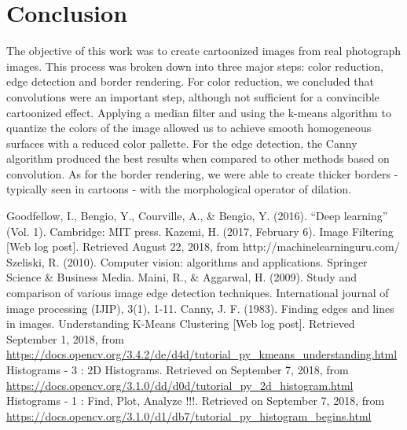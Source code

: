 \documentclass[]{IEEEtran}
\begin{document}
  \section{Conclusion}
    The objective of this work was to create cartoonized images from real photograph images.
    This process was broken down into three major steps: color reduction, edge detection and border rendering.
    For color reduction, we concluded that convolutions were an important step, although not sufficient for a
    convincible cartoonized effect. Applying a median filter and using the k-means algorithm to quantize the colors
    of the image allowed us to achieve smooth homogeneous surfaces with a reduced color pallette. For the edge detection,
    the Canny algorithm produced the best results when compared to other methods based on convolution.
    As for the border rendering, we were able to create thicker borders - typically seen in cartoons - with the morphological operator of dilation.

\begin{thebibliography}{00}
     Goodfellow, I., Bengio, Y., Courville, A., \& Bengio, Y. (2016). ``Deep learning'' (Vol. 1). Cambridge: MIT press.
     Kazemi, H. (2017, February 6). Image Filtering [Web log post]. Retrieved August 22, 2018, from http://machinelearninguru.com/
     Szeliski, R. (2010). Computer vision: algorithms and applications. Springer Science \& Business Media.
     Maini, R., \& Aggarwal, H. (2009). Study and comparison of various image edge detection techniques. International journal of image processing (IJIP), 3(1), 1-11.
     Canny, J. F. (1983). Finding edges and lines in images.
     Understanding K-Means Clustering [Web log post]. Retrieved
        September 1, 2018, from
        \url{https://docs.opencv.org/3.4.2/de/d4d/tutorial\_py\_kmeans\_understanding.html}
        Histograms - 3 : 2D Histograms. Retrieved on September 7, 2018, from
        \url{https://docs.opencv.org/3.1.0/dd/d0d/tutorial_py_2d_histogram.html}
        Histograms - 1 : Find, Plot, Analyze !!!. Retrieved on September 7, 2018, from
        \url{https://docs.opencv.org/3.1.0/d1/db7/tutorial_py_histogram_begins.html}
\end{thebibliography}
\end{document}
